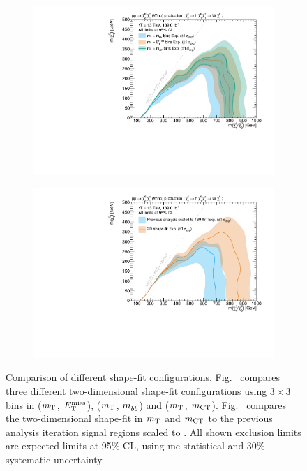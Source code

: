  \begin{figure}
	\centering
	\begin{subfigure}[b]{0.5\linewidth}
		\centering\includegraphics[width=1.0\textwidth]{HF/plot_binnings}
		\caption{\label{fig:plot_binnings}}
	\end{subfigure}\hfill
	\begin{subfigure}[b]{0.5\linewidth}
		\centering\includegraphics[width=1.0\textwidth]{HF/plot_2d_shapefit}
		\caption{\label{fig:previous_analysis_comparison}}
	\end{subfigure}\hfill

	\caption{Comparison of different shape-fit configurations. Fig.~ compares three different two-dimensional shape-fit configurations using $3\times 3$ bins in ($m_{\textrm{T}}$, $E_{\textrm{T}}^{\textrm{miss}}$), ($m_{\textrm{T}}$, $m_{b\bar{b}}$) and ($m_{\textrm{T}}$, $m_{\textrm{CT}}$). Fig.~ compares the two-dimensional shape-fit in $m_{\textrm{T}}$ and $m_{\textrm{CT}}$ to the previous analysis iteration signal regions scaled to \onethirtynineifb. All shown exclusion limits are expected limits at 95\% CL, using \gls{mc} statistical and 30\% systematic uncertainty.}
	\label{fig:results_HF_scans}
\end{figure}


